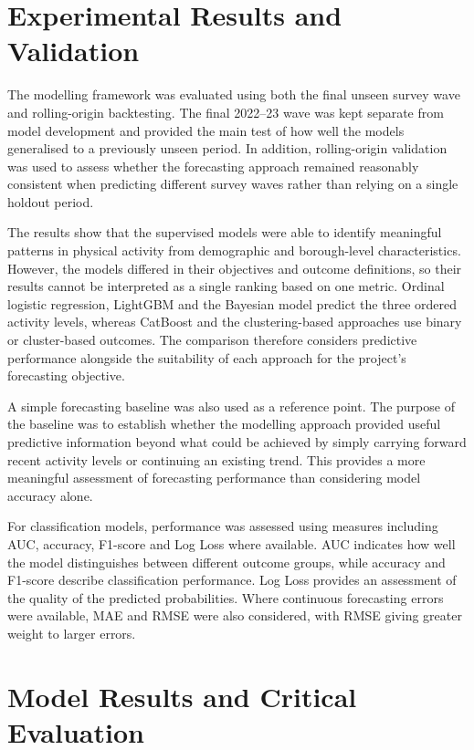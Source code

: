 \documentclass[ %
                    author={Ashrey Ashrey, Sanya Kapoor, Trisha Sharma, Yash Bhooshan Pandloskar},
                supervisor={Dr. Dalila O’Grady},
                    degree={MSc},
                     title={Using machine learning to forecast physical activity participation, volunteering and activity patterns in London},
                  subtitle={},
                      type={},
                      year={2021}]{dissertation}
\begin{document}
\FloatBarrier
\section{Experimental Results and Validation}

\noindent
The modelling framework was evaluated using both the final unseen survey wave and rolling-origin backtesting. The final 2022--23 wave was kept separate from model development and provided the main test of how well the models generalised to a previously unseen period. In addition, rolling-origin validation was used to assess whether the forecasting approach remained reasonably consistent when predicting different survey waves rather than relying on a single holdout period.

The results show that the supervised models were able to identify meaningful patterns in physical activity from demographic and borough-level characteristics. However, the models differed in their objectives and outcome definitions, so their results cannot be interpreted as a single ranking based on one metric. Ordinal logistic regression, LightGBM and the Bayesian model predict the three ordered activity levels, whereas CatBoost and the clustering-based approaches use binary or cluster-based outcomes. The comparison therefore considers predictive performance alongside the suitability of each approach for the project's forecasting objective.

A simple forecasting baseline was also used as a reference point. The purpose of the baseline was to establish whether the modelling approach provided useful predictive information beyond what could be achieved by simply carrying forward recent activity levels or continuing an existing trend. This provides a more meaningful assessment of forecasting performance than considering model accuracy alone.

For classification models, performance was assessed using measures including AUC, accuracy, F1-score and Log Loss where available. AUC indicates how well the model distinguishes between different outcome groups, while accuracy and F1-score describe classification performance. Log Loss provides an assessment of the quality of the predicted probabilities. Where continuous forecasting errors were available, MAE and RMSE were also considered, with RMSE giving greater weight to larger errors.

\FloatBarrier
\section{Model Results and Critical Evaluation}
\end{document}
